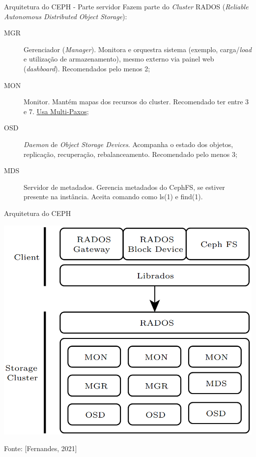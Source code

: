\documentclass[xcolor=dvipsnames,table]{beamer}
\begin{document}
\begin{frame}{Arquitetura do CEPH - Parte servidor}
	Fazem parte do \textit{Cluster} RADOS (\textit{Reliable Autonomous Distributed Object Storage}):
	\begin{description}
		\item[MGR] Gerenciador (\textit{Manager}). Monitora e orquestra sistema (exemplo, carga/\textit{load} e utilização de armazenamento), mesmo externo via painel web (\textit{dashboard}). Recomendados pelo menos 2; \pause
		\item[MON] Monitor. Mantém mapas dos recursos do cluster. Recomendado ter entre 3 e 7. \underline{Usa Multi-Paxos}; \pause
		\item[OSD] \textit{Daemon} de \textit{Object Storage Devices}. Acompanha o estado dos objetos, replicação, recuperação, rebalanceamento. Recomendado pelo menos 3; \pause
		\item[MDS] Servidor de metadados. Gerencia metadados do CephFS, se estiver presente na instância. Aceita comando como ls(1) e find(1).
	\end{description}
\end{frame}

\begin{frame}{Arquitetura do CEPH}
	\begin{center}
		\includegraphics[scale=0.25]{ceph2.png}
	\end{center}
	Fonte: [Fernandes, 2021]
\end{frame}
\end{document}
